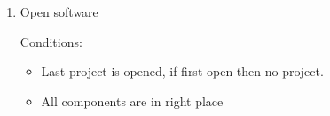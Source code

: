 \begin{enumerate}

\item Open software

Conditions:
\begin{itemize}
\item Last project is opened, if first open then no project.
\item All components are in right place
\end{itemize}

\end{enumerate}